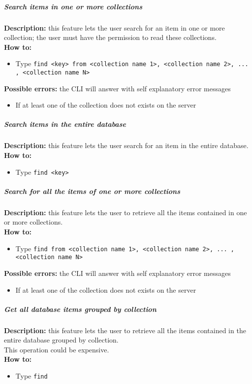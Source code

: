 \documentclass{scalatekids-article}
\begin{document}
\subparagraph{Search items in one or more collections}
\textbf{Description:} this feature lets the user search for an item in one or more collection; the user must have the permission to read these collections.\\
\textbf{How to:} 
\begin{itemize}
	\item Type \texttt{find <key> from <collection name 1>, <collection name 2>, ... , <collection name N>}
\end{itemize}
\textbf{Possible errors:} the CLI will answer with self explanatory error messages 
\begin{itemize}
	\item If at least one of the collection does not exists on the server
\end{itemize}

\subparagraph{Search items in the entire database}
\textbf{Description:} this feature lets the user search for an item in the entire database.\\
\textbf{How to:} 
\begin{itemize}
	\item Type \texttt{find <key>}
\end{itemize}

\subparagraph{Search for all the items of one or more collections}
\textbf{Description:} this feature lets the user to retrieve all the items contained in one or more collections.\\
\textbf{How to:} 
\begin{itemize}
	\item Type \texttt{find from <collection name 1>, <collection name 2>, ... , <collection name N>}
\end{itemize}
\textbf{Possible errors:} the CLI will answer with self explanatory error messages 
\begin{itemize}
	\item If at least one of the collection does not exists on the server
\end{itemize}

\subparagraph{Get all database items grouped by collection}
\textbf{Description:} this feature lets the user to retrieve all the items contained in the entire database grouped by collection.\\
This operation could be expensive.\\
\textbf{How to:} 
\begin{itemize}
	\item Type \texttt{find}
\end{itemize}
\end{document}
